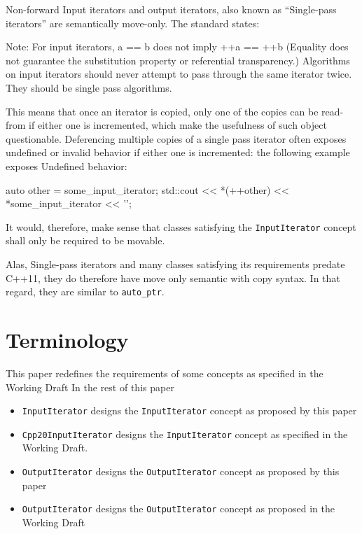 \documentclass{wg21}
\begin{document}
Non-forward Input iterators and output iterators, also known as
``Single-pass iterators'' are semantically move-only. The standard
states:

Note: For input iterators, a == b does not imply ++a == ++b (Equality
does not guarantee the substitution property or referential
transparency.) Algorithms on input iterators should never attempt to
pass through the same iterator twice. They should be single pass
algorithms.

This means that once an iterator is copied, only one of the copies can
be read-from if either one is incremented, which make the usefulness of
such object questionable. Deferencing multiple copies of a single pass
iterator often exposes undefined or invalid behavior if either one is
incremented: the following example exposes Undefined behavior: 
\begin{codeblock}

auto other = some_input_iterator;
std::cout << *(++other) << *some_input_iterator << '\n';
\end{codeblock}

It would, therefore, make sense that classes satisfying the
\texttt{InputIterator} concept shall only be required to be movable.

Alas, Single-pass iterators and many classes satisfying its requirements
predate C++11, they do therefore have move only semantic with copy
syntax. In that regard, they are similar to \texttt{auto\_ptr}.

\hypertarget{terminology}{%
	\section{Terminology}\label{terminology}}

This paper redefines the requirements of some concepts as specified in
the Working Draft In the rest of this paper

\begin{itemize}
	\item
	\texttt{InputIterator} designs the \texttt{InputIterator} concept as
	proposed by this paper
	\item
	\texttt{Cpp20InputIterator} designs the \texttt{InputIterator} concept
	as specified in the Working Draft.
	\item
	\texttt{OutputIterator} designs the \texttt{OutputIterator} concept as
	proposed by this paper
	\item
	\texttt{OutputIterator} designs the \texttt{OutputIterator} concept as
	proposed in the Working Draft
\end{itemize}
\end{document}
